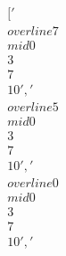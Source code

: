 \documentclass[preview]{standalone}
\begin{document}
\begin{align*}
['\\overline{7} \\mid 0 \\ 3 \\ 7 \\ 10', '\\overline{5} \\mid 0 \\ 3 \\ 7 \\ 10', '\\overline{0} \\mid 0 \\ 3 \\ 7 \\ 10', '~\\%
\end{align*}
\end{document}
